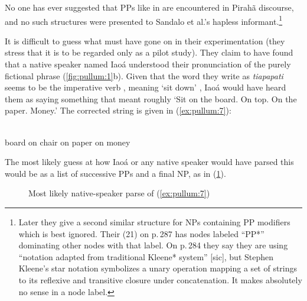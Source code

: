 \documentclass[output=paper,colorlinks,citecolor=brown
]{langscibook}
\begin{document}
No one has ever suggested that PPs like in  are encountered 
in Pirah{\~a}
discourse, and no such structures were presented to Sandalo et al.'s
hapless informant.\footnote{%
   Later they give a second similar structure for NPs containing PP
   modifiers which is best ignored. Their (21) on p.\,287 has nodes
   labeled ``PP*'' dominating other nodes with that label. On p.\,284
   they say they are using ``notation adapted from traditional Kleene*
   system'' [sic], but Stephen Kleene's star notation symbolizes a
   unary operation mapping a set of strings to its reflexive and
   transitive closure under concatenation. It makes absolutely no
   sense in a node label.}

It is difficult to guess what must have gone on in their experimentation
(they stress that it is to be regarded only as a pilot study). They claim
to have found that a native speaker named Iao{\'a} understood their
pronunciation of the purely fictional phrase (\ref{fig:pullum:1}b). Given that the word
they write as \textit{tiapapati} seems to be the imperative verb
, meaning `sit down'
\citep[786—787]{EverGibs19}, Iao{\'a} would have heard them as
saying something that meant roughly `Sit on the board. On top. On
the paper. Money.' The corrected string is given in (\ref{ex:pullum:7}):

\ea
\label{ex:pullum:7}
\gll {}  
      \\
    board on chair on paper on money \\
\z

The most likely guess at how Iao{\'a} or any native speaker would
have parsed this would be as a list of successive PPs and a final NP,
as in (\ref{fig:pullum:3}).

\begin{figure}
    \centering
\quad{}
    \caption{Most likely native-speaker parse of (\ref{ex:pullum:7})}
    \label{fig:pullum:3}
\end{figure}
\end{document}
